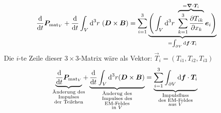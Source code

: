 \begin{equation*}
\frac{\textrm{d} }{\textrm{d} t} \bm{P}_{\textrm{mat}_V} + \frac{\textrm{d} }{\textrm{d} t} \int_V \textrm{d}^3 r \ (\bm{D} \times \bm{B}) = \sum_{i=1}^{3} \underbrace{\Bigg(\int_{V} \textrm{d}^3 r\ \overbrace{\sum_{k=1}^{3} \frac{\partial T_{ik}}{\partial x_k}}^{= \bm{\nabla} \cdot \bm{T}_i} \bm{e}_i \Bigg)}_{= \int_{\partial V} \textrm{d} \bm{f} \cdot \bm{T}_i}
\end{equation*}
Die $ i $-te Zeile dieser $ 3 \times 3 $-Matrix wäre als Vektor: $ \vec{T}_i = (T_{i1}, T_{i2}, T_{i3}) $
\begin{equation*}
\ub{\prd{}{t} \vec{P}_{\tx{mat}_V}}_{\mathclap{\substack{\tx{Änderung des} \\ \tx{Impulses} \\ \tx{der Teilchen}}}} + \ub{\prd{}{t} \int_V \dd^3 r (\vec{D} \times \vec{B})}_{\mathclap{\substack{\tx{Änderug des} \\ \tx{Impulses des} \\ \tx{EM-Feldes} \\ \tx{in } V}}} = \ub{\sum_{i = 1}^{3} \int_{\partial V} \dd \vec{f} \cdot \vec{T}_i}_{\mathclap{\substack{\tx{Impulsfluss} \\ \tx{des EM-Feldes} \\ \tx{aus } V}}}
\end{equation*}


\begin{comment}
\begin{align*}
\prd{}{t} P_{\tx{mat}_V} &= \sum_i \vec{F}_i = \sum_i q_i (\vec{E}(\vec{r},t) + \vec{v}_i \times \vec{B}(\vec{r}_i,t)\\
&= \int_V \dd^3r (\rho \vec{E} + \vec{j} \times \vec{B})
\end{align*}
\begin{equation*}
\Rightarrow \prd{}{t} P_{\tx{mat}_V} + \prd{}{t} \int_V\dd^3 r(\vec{D} \times \vec{B}) = \sum_{i=1}^{3} \ub{\int_V \dd^2 r \sum_{k=1}^{3} \prt{T_{ik}}{x_k} \vec{e}_i}_{= \int_{\partial V} \dd\vec{f} \cdot \vec{T}_i \vec{e}_i}
\end{equation*}
\end{comment}

